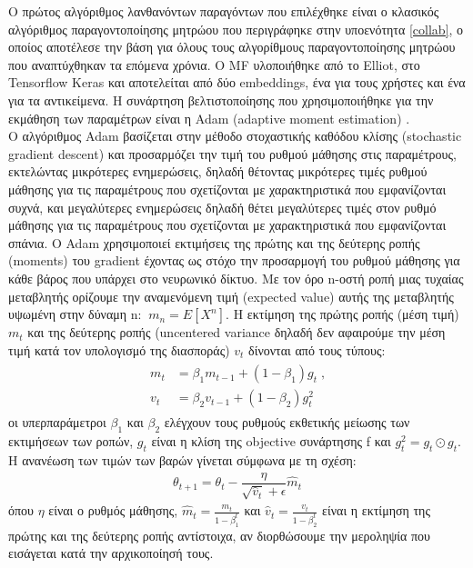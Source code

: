 Ο πρώτος αλγόριθμος λανθανόντων παραγόντων που επιλέχθηκε είναι ο κλασικός αλγόριθμος παραγοντοποίησης μητρώου \cite{korenMatrixFactorizationTechniques2009} που περιγράφηκε στην υποενότητα \ref{collab}, ο οποίος αποτέλεσε την βάση για όλους τους αλγορίθμους παραγοντοποίησης μητρώου που αναπτύχθηκαν τα επόμενα χρόνια. Ο MF υλοποιήθηκε από το Elliot, στο Tensorflow Keras και αποτελείται από δύο embeddings, ένα για τους χρήστες και ένα για τα αντικείμενα. Η συνάρτηση βελτιστοποίησης που χρησιμοποιήθηκε για την εκμάθηση των παραμέτρων είναι η Adam (adaptive moment estimation) \cite{kingmaAdamMethodStochastic2015}.\\ Ο αλγόριθμος Adam βασίζεται στην μέθοδο στοχαστικής καθόδου κλίσης (stochastic gradient descent) και προσαρμόζει την τιμή του ρυθμού μάθησης στις παραμέτρους, εκτελώντας μικρότερες ενημερώσεις, δηλαδή θέτοντας μικρότερες τιμές ρυθμού μάθησης για τις παραμέτρους που σχετίζονται με χαρακτηριστικά που εμφανίζονται συχνά, και μεγαλύτερες ενημερώσεις δηλαδή θέτει μεγαλύτερες τιμές στον ρυθμό μάθησης για τις παραμέτρους που σχετίζονται με χαρακτηριστικά που εμφανίζονται σπάνια. Ο Adam χρησιμοποιεί εκτιμήσεις της πρώτης και της δεύτερης ροπής (moments) του gradient έχοντας ως στόχο την προσαρμογή του ρυθμού μάθησης για κάθε βάρος που υπάρχει στο νευρωνικό δίκτυο. Με τον όρο n-οστή ροπή μιας τυχαίας μεταβλητής ορίζουμε την αναμενόμενη τιμή (expected value) αυτής της μεταβλητής υψωμένη στην δύναμη n:  $\: m_{n} = E\left[ X^n \right]  $. Η εκτίμηση της πρώτης ροπής (μέση τιμή) $ m_{t} $ και της δεύτερης ροπής (uncentered variance δηλαδή δεν αφαιρούμε την μέση τιμή κατά τον υπολογισμό της διασποράς) $ v_t $ δίνονται από τους τύπους:\\ 
\begin{align} 
	\begin{split} 
		m_t &= \beta_1 m_{t-1} + (1 - \beta_1) g_t \; \text{,}\\ 
		v_t &= \beta_2 v_{t-1} + (1 - \beta_2) g_t^2 
	\end{split} 
\end{align}
οι υπερπαράμετροι $ \beta_1 $ και $ \beta_2 $ ελέγχουν τους ρυθμούς εκθετικής μείωσης των εκτιμήσεων των ροπών, $  g_t $ είναι η κλίση της objective συνάρτησης f και $ g_t^2 = g_t \odot g_t $. Η ανανέωση των τιμών των βαρών γίνεται σύμφωνα με τη σχέση:
\begin{align}  
	\theta_{t+1} = \theta_{t} - \dfrac{\eta}{\sqrt{\hat{v}_t} + \epsilon} \hat{m}_t 
\end{align} όπου $ \eta $ είναι ο ρυθμός μάθησης, $ \hat{m}_t = \frac{m_t}{1-β_1^{t}} $ και $ \hat{v}_t = \frac{v_t}{1-β_2^{t}}$ είναι η εκτίμηση της πρώτης και της δεύτερης ροπής αντίστοιχα, αν διορθώσουμε την μεροληψία που εισάγεται κατά την αρχικοποίησή τους.\\\\\\

